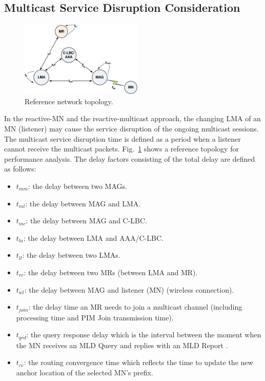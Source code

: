 \subsection{Multicast Service Disruption Consideration}
\begin{figure}[tb!] 
  \begin{center} 
    \includegraphics[width=0.52\textwidth]{./Part2/Chapter5/figures/topology_analysis.eps} 
    \caption[Reference network topology for multicast service disruption analysis: from the load balancing perspective]{Reference network topology.}
    \label{fig:topology_analysis}
  \end{center} 
\end{figure}
In the reactive-MN and the reactive-multicast approach, the changing LMA of an MN (listener) may cause the service disruption of the ongoing multicast sessions. The multicast service disruption time is defined as a period when a listener cannot receive the multicast packets. Fig.~\ref{fig:topology_analysis} shows a reference topology for performance analysis. The delay factors consisting of the total
delay are defined as follows:
\setlength \abovedisplayskip{-1pt}
\vspace{-0.1in}
\begin{itemize}
\itemsep 0.07em
\item $t_{mm}$: the delay between two MAGs.
\item $t_{ml}$: the delay between MAG and LMA.
\item $t_{mc}$: the delay between MAG and C-LBC.
\item $t_{la}$: the delay between LMA and AAA/C-LBC.
\item $t_{ll}$: the delay between two LMAs. 
\item $t_{rr}$: the delay between two MRs (between LMA and MR).
\item $t_{wl}$: the delay between MAG and listener (MN) (wireless connection).
\item $t_{join}$: the delay time an MR needs to join a multicast channel (including processing time and PIM Join transmission time).
\item $t_{qrd}$: the query response delay which is the interval between the moment when the MN receives an MLD Query and replies with an MLD Report \cite{MLDv2}.
\item $t_{cv}$: the routing convergence time which reflects the time to update the new anchor location of the selected MN's prefix.
\end{itemize}

